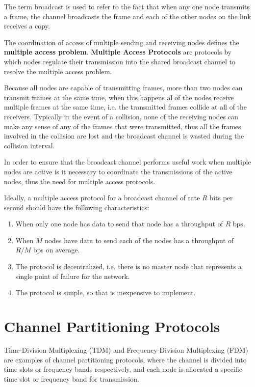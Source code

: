 \documentclass[12pt letter]{report}
\begin{document}
The term broadcast is used to refer to the fact that when any one
node transmits a frame, the channel broadcasts the frame and each of
the other nodes on the link receives a copy.

The coordination of access of multiple sending and receiving nodes
defines the \textbf{multiple access problem}. \textbf{Multiple Access
Protocols} are protocols by which nodes regulate their transmission
into the shared broadcast channel to resolve the multiple access problem.

Because all nodes are capable of transmitting frames, more than two
nodes can transmit frames at the same time, when this happens al of
the nodes receive multiple frames at the same time, i.e. the
transmitted frames collide at all of the receivers. Typically in the
event of a collision, none of the receiving nodes can  make any sense
of any of the frames that were transmitted, thus all the frames
involved in the collision are lost and the broadcast channel is
wasted during the collision interval.

In order to ensure that the broadcast channel performs useful work
when multiple nodes are active is it necessary to coordinate the
transmissions of the active nodes, thus the need for multiple access protocols.

Ideally, a multiple access protocol for a broadcast channel of rate
$R$ bits per second should have the following characteristics:

\begin{enumerate}
  \item  When only one node has data to send that node has a
    throughput of $R$ bps.
  \item When $M$ nodes have data to send each of the nodes has a
    throughput of $R/M$ bps on average.
  \item The protocol is decentralized, i.e. there is no master node
    that represents a single point of failure for the network.
  \item The protocol is simple, so that is inexpensive to implement.
\end{enumerate}

\section{Channel Partitioning Protocols}

Time-Division Multiplexing (TDM) and Frequency-Division Multiplexing
(FDM) are examples of channel
partitioning protocols, where the channel is divided into time slots
or frequency bands respectively, and each node is allocated a
specific time slot or frequency band for transmission.
\end{document}
